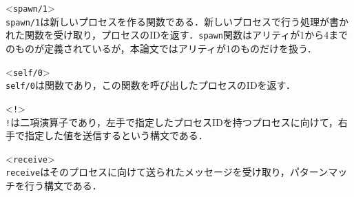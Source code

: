 \begin{description}
\item<\lstinline{spawn/1}>\mbox{}\\
  \lstinline{spawn/1}は新しいプロセスを作る関数である．新しいプロセスで行う処理が書かれた関数を受け取り，プロセスのIDを返す．\lstinline{spawn}関数はアリティが1から4までのものが定義されているが，本論文ではアリティが1のものだけを扱う．
\item<\lstinline{self/0}>\mbox{}\\
  \lstinline{self/0}は関数であり，この関数を呼び出したプロセスのIDを返す．
\item<\lstinline{!}>\mbox{}\\
  \lstinline{!}は二項演算子であり，左手で指定したプロセスIDを持つプロセスに向けて，右手で指定した値を送信するという構文である．
\item<\lstinline{receive}>\mbox{}\\
  \lstinline{receive}はそのプロセスに向けて送られたメッセージを受け取り，パターンマッチを行う構文である．
\end{description}
